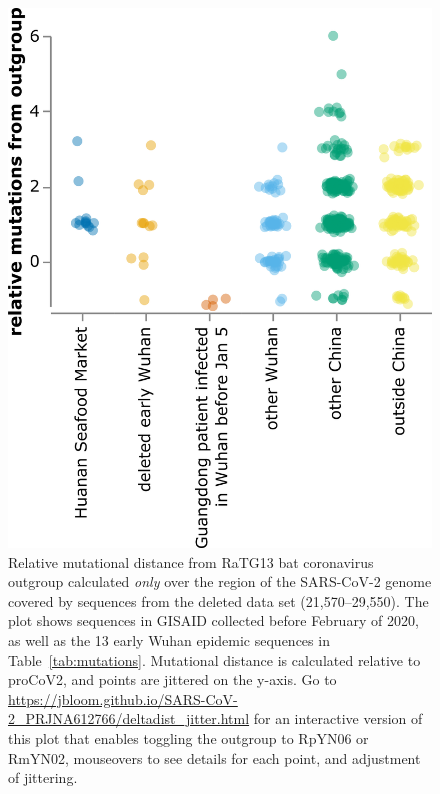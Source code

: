 \documentclass[9pt,twocolumn,twoside]{gsajnl_modified}
\begin{document}
\begin{figure}
\centering
\includegraphics[width=0.75\linewidth]{figures/deltadist_jitter.png}
\caption{
Relative mutational distance from RaTG13 bat coronavirus outgroup calculated \emph{only} over the region of the SARS-CoV-2 genome covered by sequences from the deleted data set (21,570--29,550).
The plot shows sequences in GISAID collected before February of 2020, as well as the 13 early Wuhan epidemic sequences in Table~\ref{tab:mutations}.
Mutational distance is calculated relative to proCoV2, and points are jittered on the y-axis.
Go to \url{https://jbloom.github.io/SARS-CoV-2_PRJNA612766/deltadist_jitter.html} for an interactive version of this plot that enables toggling the outgroup to RpYN06 or RmYN02, mouseovers to see details for each point, and adjustment of jittering.
\label{fig:deltadist_jitter}
}
\end{figure}
\end{document}
